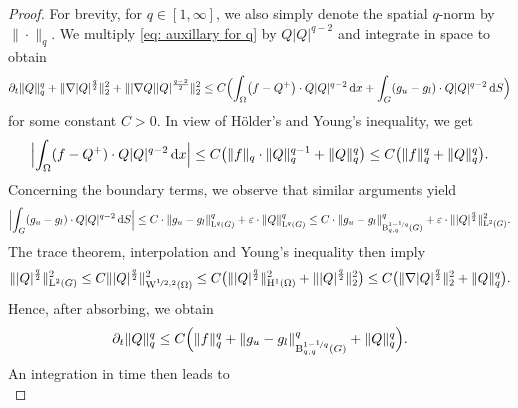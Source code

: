 \documentclass[10pt,a4paper]{amsart}
\newcommand{\del}{\partial}
\newcommand{\dt}{\del_t}
\newcommand{\eps}{\varepsilon}
\newcommand{\rB}{\mathrm{B}}
\newcommand{\rH}{\mathrm{H}}
\newcommand{\rL}{\mathrm{L}}
\newcommand{\rLq}{\rL^q}
\newcommand{\rW}{\mathrm{W}}
\newcommand{\srd}{\, \mathrm{d}}
\begin{document}
\begin{proof}
For brevity, for $q \in [1,\infty]$, we also simply denote the spatial $q$-norm by~$\| \cdot \|_q$.
We multiply \eqref{eq: auxillary for q} by $Q|Q|^{q-2}$ and integrate in space to obtain
\begin{equation*}
    \begin{aligned}
        \dt \| Q \|^q_q + \| \nabla | Q |^{\frac{q}{2}} \|^2_2 + \| |\nabla Q|  | Q|^{\frac{q-2}{2}} \|^2_2
        \leq C   \Bigl ( \int_\Omega \bigl (f - Q^+ \bigr )\cdot Q |Q|^{q-2} \srd x  + \int_G (g_u -g_l) \cdot Q |Q|^{q-2} \srd S\Bigr )
    \end{aligned}
\end{equation*}
for some constant $C>0$. 
In view of H\"older's and Young's inequality, we get
\begin{equation*}
    \Bigl | \int_\Omega (f - Q^+)\cdot Q |Q|^{q-2} \srd x \Bigr | \leq C \bigl ( \| f \|_q \cdot  \| Q \|_q^{q-1} + \| Q \|^q_q \bigr ) \leq C \bigl ( \| f\|^q_q + \| Q\|^q_q \bigr).
\end{equation*}
Concerning the boundary terms, we observe that similar arguments yield
\begin{equation*}
    \begin{aligned}
        \Bigl | \int_G (g_u -g_l) \cdot Q |Q|^{q-2} \srd S\Bigr | 
        \leq C \cdot \| g_u -g_l \|_{\rLq(G)}^q + \eps \cdot \| Q \|^q_{\rLq(G)}
        \leq C \cdot \| g_u -g_l \|^q_{\rB_{q,q}^{1 - \nicefrac{1}{q}}(G)} + \eps \cdot \| |Q|^{\frac{q}{2}} \|^2_{\rL^2(G)}.
    \end{aligned}
\end{equation*}
The trace theorem, interpolation and Young's inequality then imply
\begin{equation*}
    \begin{aligned}
        \| |Q|^{\frac{q}{2}} \|^2_{\rL^2(G)} \leq C \| |Q|^{\frac{q}{2}} \|^2_{\rW^{\nicefrac{1}{2},2}(\Omega)} 
        \leq C \bigl (\| |Q|^{\frac{q}{2}} \|^2_{\rH^{1}(\Omega)} + \||Q|^{\frac{q}{2}} \|^2_2 \bigr )
        \leq C\bigl ( \|\nabla |Q|^{\frac{q}{2}} \|^2_2 + \| Q\|^q_q \bigr ). 
    \end{aligned}
\end{equation*}
Hence, after absorbing, we obtain 
\begin{equation*}
    \dt \| Q \|^q_q \leq C \Bigl ( \| f\|^q_q + \| g_u -g_l \|^q_{\rB_{q,q}^{1 - \nicefrac{1}{q}}(G)}+ \| Q\|^q_q \Bigr). 
\end{equation*}
An integration in time then leads to
\begin{equation*}

\end{equation*}
\end{proof}
\end{document}
